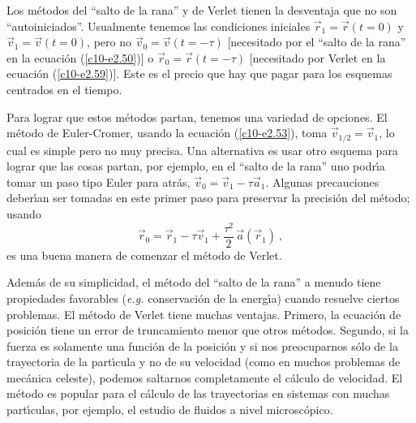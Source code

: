 Los m{\'e}todos del ``salto de la rana'' y de Verlet tienen la desventaja que
no son ``autoiniciados''. Usualmente tenemos las condiciones iniciales
$\vec r_1=\vec r(t=0)$ y $\vec v_1=\vec v(t=0)$, pero no $\vec v_0=
\vec v(t=-\tau)$ [necesitado por el ``salto de la rana'' en la ecuaci{\'o}n
(\ref{c10-e2.50})] o $\vec r_0=\vec r(t=-\tau)$ [necesitado por Verlet
en la ecuaci{\'o}n (\ref{c10-e2.59})]. Este es el precio que hay que pagar
para los esquemas centrados en el tiempo.

Para lograr que estos m{\'e}todos partan, tenemos una variedad de
opciones. El m{\'e}todo de Euler-Cromer, usando la ecuaci{\'o}n
(\ref{c10-e2.53}), toma $\vec v_{1/2}=\vec v_1$, lo cual es simple
pero no muy precisa. Una alternativa es usar otro esquema para lograr
que las cosas partan, por ejemplo, en el ``salto de la rana'' uno
podr{\'\i}a tomar un paso tipo Euler para atr{\'a}s, $\vec v_0=\vec v_1-\tau\vec
a_1$. Algunas precauciones deber{\'\i}an ser tomadas en este primer paso
para preservar la precisi{\'o}n del m{\'e}todo; usando
\begin{equation}
\label{c10-e2.60}
\vec r_0=\vec r_1-\tau \vec v_1 + \frac{\tau^2}{2} \, \vec a(\vec r_1)\ ,
\end{equation}
es una buena manera de comenzar el m{\'e}todo de Verlet.

Adem{\'a}s de su simplicidad, el m{\'e}todo del ``salto de la rana'' a menudo
tiene propiedades favorables ({\it e.g.} conservaci{\'o}n de la energ{\'\i}a)
cuando resuelve ciertos problemas. El m{\'e}todo de Verlet tiene muchas
ventajas. Primero, la ecuaci{\'o}n de posici{\'o}n tiene un error de
truncamiento menor que otros m{\'e}todos. Segundo, si la fuerza es
solamente una funci{\'o}n de la posici{\'o}n y si nos preocuparnos s{\'o}lo de la
trayectoria de la part{\'\i}cula y no de su velocidad (como en muchos
problemas de mec{\'a}nica celeste), podemos saltarnos completamente el
c{\'a}lculo de velocidad. El m{\'e}todo es popular para el c{\'a}lculo de las
trayectorias en sistemas con muchas part{\'\i}culas, por ejemplo, el
estudio de fluidos a nivel microsc{\'o}pico.


